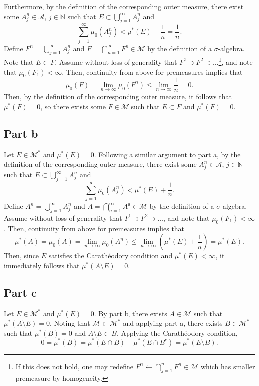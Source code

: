\documentclass{article}
\begin{document}
Furthermore, by the definition of the corresponding outer measure, there exist some $A^n_j\in\mathcal A$, $j\in\mathbb{N}$ such that $E\subset\bigcup_{j=1}^\infty A^n_j$ and
\[
\sum_{j=1}^\infty\mu_0(A^n_j)<\mu^*(E)+\frac{1}{n}=\frac{1}{n}.
\]
Define $F^n=\bigcup_{j=1}^\infty A^n_j$ and $F=\bigcap_{n=1}^\infty F^n\in\mathcal M$ by the definition of a $\sigma$-algebra. Note that $E\subset F$. Assume without loss of generality that $F^1\supset F^2\supset\ldots$\footnote{If this does not hold, one may redefine $F^n\leftarrow\bigcap_{j=1}^nF^n\in\mathcal M$ which has smaller premeasure by homogeneity.}, and note that $\mu_0(F_1)<\infty$. Then, continuity from above for premeasures implies that
\[
\mu_0(F)=\lim_{n\to\infty}\mu_0(F^n)\leq\lim_{n\to\infty}\frac{1}{n}=0.
\]
Then, by the definition of the corresponding outer measure, it follows that $\mu^*(F)=0$, so there exists some $F\in\mathcal M$ such that $E\subset F$ and $\mu^*(F)=0$.

\subsection{Part b}
Let $E\in\mathcal M^*$ and $\mu^*(E)=0$. Following a similar argument to part a,  by the definition of the corresponding outer measure, there exist some $A^n_j\in\mathcal A$, $j\in\mathbb{N}$ such that $E\subset\bigcup_{j=1}^\infty A^n_j$ and
\[
\sum_{j=1}^\infty\mu_0(A^n_j)<\mu^*(E)+\frac{1}{n}.
\]
Define $A^n=\bigcup_{j=1}^\infty A^n_j$ and $A=\bigcap_{n=1}^\infty A^n\in\mathcal M$ by the definition of a $\sigma$-algebra. Assume without loss of generality that $F^1\supset F^2\supset\ldots$, and note that $\mu_0(F_1)<\infty$. Then, continuity from above for premeasures implies that
\[
\mu^*(A)=\mu_0(A)=\lim_{n\to\infty}\mu_0(A^n)\leq\lim_{n\to\infty}\left(\mu^*(E)+\frac{1}{n}\right)=\mu^*(E).
\]
Then, since $E$ satisfies the Carath\'eodory condition and $\mu^*(E)<\infty$, it immediately follows that $\mu^*(A\setminus E)=0$.

\subsection{Part c}
Let $E\in\mathcal M^*$ and $\mu^*(E)=0$. By part b, there exists $A\in\mathcal M$ such that $\mu^*(A\setminus E)=0$. Noting that $\mathcal M\subset \mathcal M^*$ and applying part a, there exists $B\in\mathcal M^*$ such that $\mu^*(B)=0$ and $A\setminus E\subset B$. Applying the Carath\'eodory condition,
\[
0=\mu^*(B)=\mu^*(E\cap B)+\mu^*(E\cap B^c)=\mu^*(E\setminus B).
\]
\end{document}
